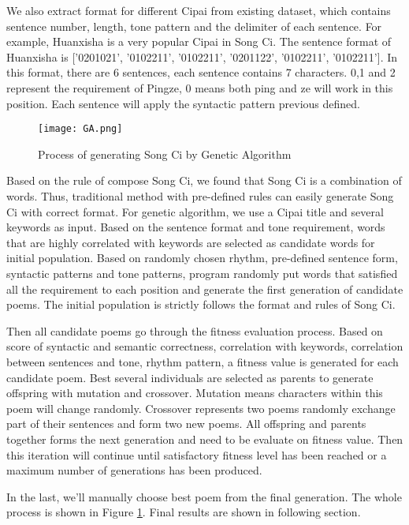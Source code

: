 We also extract format for different Cipai from existing dataset, which contains sentence number, length, tone pattern and the delimiter of each sentence.
%
For example, Huanxisha is a very popular Cipai in Song Ci.
%
The sentence format of Huanxisha is ['0201021', '0102211', '0102211', '0201122', '0102211', '0102211'].
%
In this format, there are 6 sentences, each sentence contains 7 characters.
%
0,1 and 2 represent the requirement of Pingze, 0 means both ping and ze will work in this position.
%
Each sentence will apply the syntactic pattern previous defined.


\begin{figure}[htbp]
	\centering
	\texttt{[image: GA.png]}
	\caption{Process of generating Song Ci by Genetic Algorithm}
	\label{fig:GA}
\end{figure}


Based on the rule of compose Song Ci, we found that Song Ci is a combination of words.
%
Thus, traditional method with pre-defined rules can easily generate Song Ci with correct format.
%
For genetic algorithm, we use a Cipai title and several keywords as input.
%
Based on the sentence format and tone requirement, words that are highly correlated with keywords are selected as candidate words for initial population.
%
Based on randomly chosen rhythm, pre-defined sentence form, syntactic patterns and tone patterns, program randomly put words that satisfied all the requirement to each position and generate the first generation of candidate poems.
%
The initial population is strictly follows the format and rules of Song Ci.


Then all candidate poems go through the fitness evaluation process.
%
Based on score of syntactic and semantic correctness, correlation with keywords, correlation between sentences and tone, rhythm pattern, a fitness value is generated for each candidate poem.
%
Best several individuals are selected as parents to generate offspring with mutation and crossover.
%
Mutation means characters within this poem will change randomly.
%
Crossover represents two poems randomly exchange part of their sentences and form two new poems.
%
All offspring and parents together forms the next generation and need to be evaluate on fitness value.
%
Then this iteration will continue until satisfactory fitness level has been reached or a maximum number of generations has been produced.


In the last, we'll manually choose best poem from the final generation.
%
The whole process is shown in Figure \ref{fig:GA}.
%
Final results are shown in following section.


